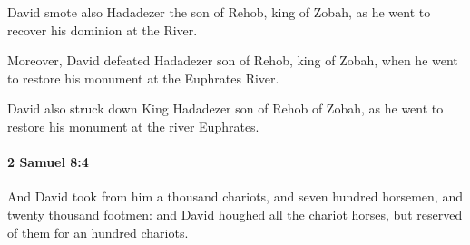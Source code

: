 			\begin{versebox}
					\item[BHS] 
					\item[ASV] David smote also Hadadezer the son of Rehob, king of Zobah, as he went to recover his dominion at the River.
					\item[NIV] Moreover, David defeated Hadadezer son of Rehob, king of Zobah, when he went to restore his monument at the Euphrates River.
					\item[NRSV] David also struck down King Hadadezer son of Rehob of Zobah, as he went to restore his monument at the river Euphrates.
			\end{versebox}

		\paragraph{2 Samuel 8:4} %
			\label{2SAMUEL-8-4}

			And David took from him a thousand chariots, and seven hundred horsemen, and twenty thousand footmen: and David houghed all the chariot horses, but reserved of them for an hundred chariots.

